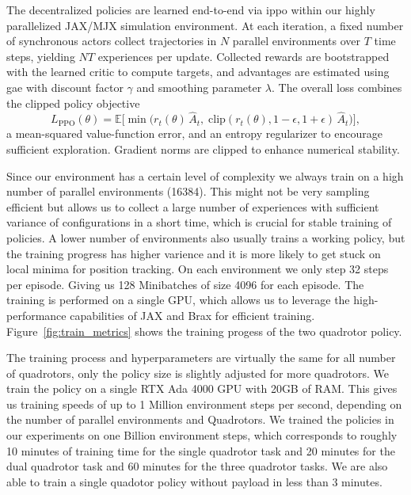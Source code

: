 The decentralized policies are learned end-to-end via \gls{ippo} within our highly parallelized JAX/MJX simulation environment. At each iteration, a fixed number of synchronous actors collect trajectories in $N$ parallel environments over $T$ time steps, yielding $NT$ experiences per update. Collected rewards are bootstrapped with the learned critic to compute targets, and advantages are estimated using \gls{gae} with discount factor $\gamma$ and smoothing parameter $\lambda$. The overall loss combines the clipped policy objective
\begin{equation}
L_{\mathrm{PPO}}(\theta) = \mathbb{E}\!\bigl[\min\bigl(r_t(\theta)\,\hat{A}_t,\;\mathrm{clip}(r_t(\theta),1-\epsilon,1+\epsilon)\,\hat{A}_t\bigr)\bigr],
\end{equation}
a mean-squared value-function error, and an entropy regularizer to encourage sufficient exploration. Gradient norms are clipped to enhance numerical stability.

Since our environment has a certain level of complexity we always train on a high number of parallel environments (16384). This might not be very sampling efficient but allows us to collect a large number of experiences with sufficient variance of configurations in a short time, which is crucial for stable training of policies. A lower number of environments also usually trains a working policy, but the training progress has higher varience and it is more likely to get stuck on local minima for position tracking. On each environment we only step 32 steps per episode. Giving us 128 Minibatches of size 4096 for each episode. The training is performed on a single GPU, which allows us to leverage the high-performance capabilities of JAX and Brax for efficient training. Figure~\ref{fig:train_metrics} shows the training progess of the two quadrotor policy. 

The training process and hyperparameters are virtually the same for all number of quadrotors, only the policy size is slightly adjusted for more quadrotors. We train the policy on a single RTX Ada 4000 GPU with 20GB of RAM. This gives us training speeds of up to 1 Million environment steps per second, depending on the number of parallel environments and Quadrotors. We trained the policies in our experiments on one Billion environment steps, which corresponds to roughly 10 minutes of training time for the single quadrotor task and 20 minutes for the dual quadrotor task and 60 minutes for the three quadrotor tasks. We are also able to train a single quadotor policy without payload in less than 3 minutes. 

